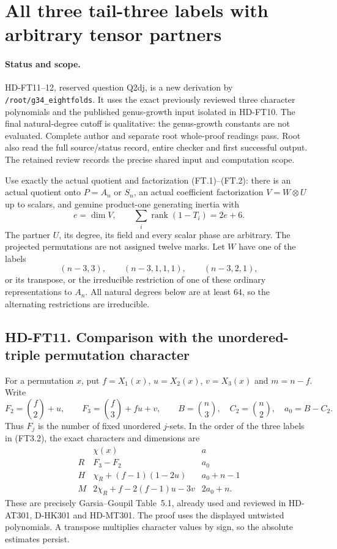 \section{All three tail-three labels with arbitrary tensor partners}
\label{sec:factorwise-three-tail}

\paragraph{Status and scope.}
HD-FT11--12, reserved question Q2dj, is a new derivation by
\texttt{/root/g34\_eightfolds}.  It uses the exact previously reviewed
three character polynomials and the published genus-growth input
isolated in HD-FT10.  The final natural-degree cutoff is qualitative:
the genus-growth constants are not evaluated. Complete author and
separate root whole-proof readings pass. Root also read the full
source/status record, entire checker and first successful output.
The retained review records the precise shared input and computation scope.

Use exactly the actual quotient and factorization (FT.1)--(FT.2):
there is an actual quotient onto \(P=A_n\) or \(S_n\), an actual
coefficient factorization \(V=W\otimes U\) up to scalars, and genuine
product-one generating inertia with
\[
 e=\dim V,\qquad \sum_i\operatorname{rank}(1-T_i)=2e+6.
 \tag{FT3.1}
\]
The partner \(U\), its degree, its field and every scalar phase are
arbitrary.  The projected permutations are not assigned twelve marks.
Let \(W\) have one of the labels
\[
 (n-3,3),\qquad(n-3,1,1,1),\qquad(n-3,2,1),
 \tag{FT3.2}
\]
or its transpose, or the irreducible restriction of one of these
ordinary representations to \(A_n\).  All natural degrees below are
at least \(64\), so the alternating restrictions are irreducible.

\subsection*{HD-FT11. Comparison with the unordered-triple permutation character}

For a permutation \(x\), put \(f=X_1(x)\), \(u=X_2(x)\), \(v=X_3(x)\)
and \(m=n-f\).  Write
\[
 F_2=\binom f2+u,\qquad F_3=\binom f3+fu+v,\qquad
 B=\binom n3,\quad C_2=\binom n2,\quad a_0=B-C_2.
 \tag{FT3.3}
\]
Thus \(F_j\) is the number of fixed unordered \(j\)-sets.
In the order of the three labels in (FT3.2), the exact characters
and dimensions are
\[
 \begin{array}{c|c|c}
 &\chi(x)&a\\ \hline
 R&F_3-F_2&a_0\\
 H&\chi_R+(f-1)(1-2u)&a_0+n-1\\
 M&2\chi_R+f-2(f-1)u-3v&2a_0+n.
 \end{array}
 \tag{FT3.4}
\]
These are precisely Garsia--Goupil Table~5.1, already used and
reviewed in HD-AT301, D-HK301 and HD-MT301.
\cite[Table~5.1, p.~31; Proposition~I.1 and proof]{HD:GarsiaGoupil2009}
The proof uses the displayed untwisted polynomials.  A transpose
multiplies character values by sign, so the absolute estimates persist.

